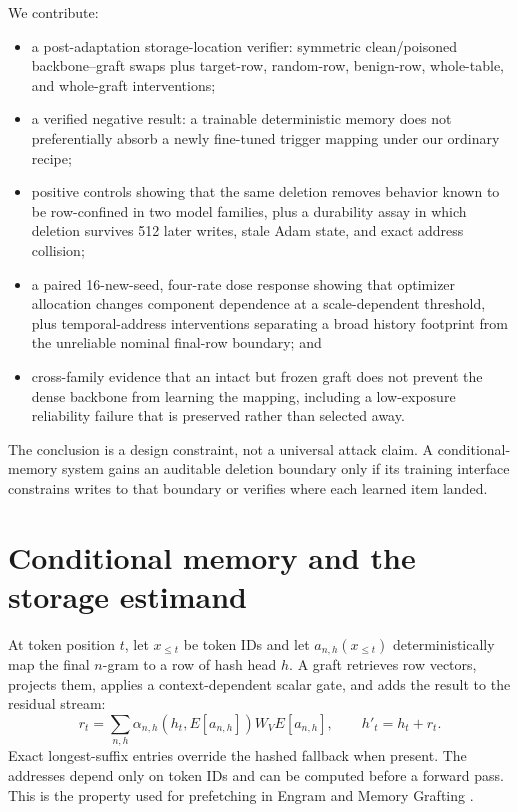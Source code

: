 \documentclass{article}
\begin{document}
We contribute:
\begin{itemize}
  \item a post-adaptation storage-location verifier: symmetric clean/poisoned
  backbone--graft swaps plus target-row, random-row, benign-row, whole-table,
  and whole-graft interventions;
  \item a verified negative result: a trainable deterministic memory does not
  preferentially absorb a newly fine-tuned trigger mapping under our ordinary
  recipe;
  \item positive controls showing that the same deletion removes behavior
  known to be row-confined in two model families, plus a durability assay in
  which deletion survives 512 later writes, stale Adam state, and exact
  address collision;
  \item a paired 16-new-seed, four-rate dose response showing that optimizer
  allocation changes component dependence at a scale-dependent threshold,
  plus temporal-address interventions separating a broad history footprint
  from the unreliable nominal final-row boundary; and
  \item cross-family evidence that an intact but frozen graft does not prevent
  the dense backbone from learning the mapping, including a low-exposure
  reliability failure that is preserved rather than selected away.
\end{itemize}

The conclusion is a design constraint, not a universal attack claim. A
conditional-memory system gains an auditable deletion boundary only if its
training interface constrains writes to that boundary or verifies where each
learned item landed.

\section{Conditional memory and the storage estimand}

At token position $t$, let $x_{\le t}$ be token IDs and let
$a_{n,h}(x_{\le t})$ deterministically map the final $n$-gram to a row of hash
head $h$. A graft retrieves row vectors, projects them, applies a
context-dependent scalar gate, and adds the result to the residual stream:
\begin{equation}
 r_t = \sum_{n,h} \alpha_{n,h}(h_t,E[a_{n,h}]) W_V E[a_{n,h}],
 \qquad h'_t=h_t+r_t .
\end{equation}
Exact longest-suffix entries override the hashed fallback when present. The
addresses depend only on token IDs and can be computed before a forward pass.
This is the property used for prefetching in Engram and Memory Grafting
\citep{engram,grafting}.
\end{document}
